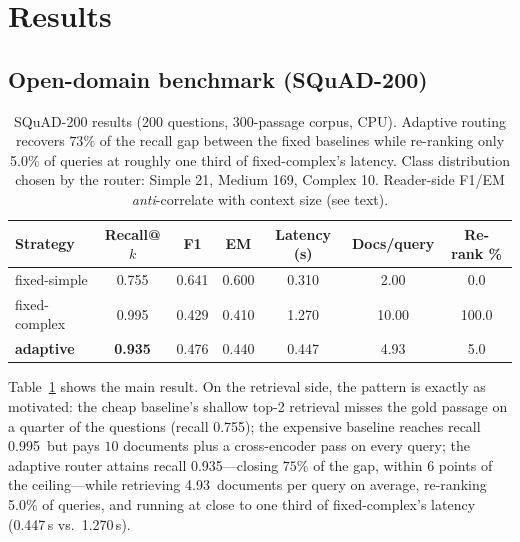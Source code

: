 \documentclass[11pt]{article}
\newcommand{\sqAdRec}{0.935}\newcommand{\sqAdFone}{0.476}\newcommand{\sqAdEM}{0.440}
\newcommand{\sqAdLat}{0.447}\newcommand{\sqAdDocs}{4.93}\newcommand{\sqAdRr}{5.0}
\newcommand{\sqSiRec}{0.755}\newcommand{\sqSiFone}{0.641}\newcommand{\sqSiEM}{0.600}
\newcommand{\sqSiLat}{0.310}\newcommand{\sqSiDocs}{2.00}\newcommand{\sqSiRr}{0.0}
\newcommand{\sqCoRec}{0.995}\newcommand{\sqCoFone}{0.429}\newcommand{\sqCoEM}{0.410}
\newcommand{\sqCoLat}{1.270}\newcommand{\sqCoDocs}{10.00}\newcommand{\sqCoRr}{100.0}
\newcommand{\sqSimple}{21}\newcommand{\sqMedium}{169}\newcommand{\sqComplex}{10}
\begin{document}
\section{Results}
\label{sec:results}

\subsection{Open-domain benchmark (SQuAD-200)}

\begin{table}[t]
\centering\small
\begin{tabular}{lcccccc}
\toprule
Strategy & Recall@$k$ & F1 & EM & Latency (s) & Docs/query & Re-rank \% \\
\midrule
fixed-simple  & \sqSiRec & \sqSiFone & \sqSiEM & \sqSiLat & \sqSiDocs & \sqSiRr \\
fixed-complex & \sqCoRec & \sqCoFone & \sqCoEM & \sqCoLat & \sqCoDocs & \sqCoRr \\
\textbf{adaptive} & \textbf{\sqAdRec} & \sqAdFone & \sqAdEM & \sqAdLat & \sqAdDocs & \sqAdRr \\
\bottomrule
\end{tabular}
\caption{SQuAD-200 results (200 questions, 300-passage corpus, CPU). Adaptive
routing recovers $73\%$ of the recall gap between the fixed baselines while
re-ranking only \sqAdRr\% of queries at roughly one third of fixed-complex's
latency. Class distribution chosen by the router: Simple \sqSimple, Medium
\sqMedium, Complex \sqComplex. Reader-side F1/EM \emph{anti}-correlate with
context size (see text).}
\label{tab:squad}
\end{table}

Table~\ref{tab:squad} shows the main result. On the retrieval side, the
pattern is exactly as motivated: the cheap baseline's shallow top-2 retrieval
misses the gold passage on a quarter of the questions (recall \sqSiRec); the
expensive baseline reaches recall \sqCoRec\ but pays $10$ documents plus a
cross-encoder pass on every query; the adaptive router attains recall
\sqAdRec---closing $75\%$ of the gap, within $6$ points of the
ceiling---while retrieving \sqAdDocs\ documents per query on average,
re-ranking \sqAdRr\% of queries, and running at close to one third of
fixed-complex's latency (\sqAdLat\,s vs.\ \sqCoLat\,s).
\end{document}
